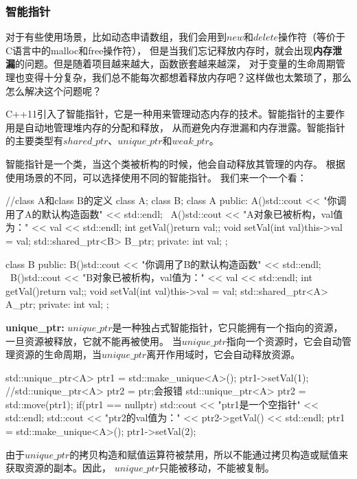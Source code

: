 \subsubsection{智能指针}
对于有些使用场景，比如动态申请数组，我们会用到$new$和$delete$操作符（等价于C语言中的malloc和free操作符），
但是当我们忘记释放内存时，就会出现\textbf{内存泄漏}的问题。但是随着项目越来越大，函数嵌套越来越深，
对于变量的生命周期管理也变得十分复杂，我们总不能每次都想着释放内存吧？这样做也太繁琐了，那么怎么解决这个问题呢？

C++11引入了智能指针，它是一种用来管理动态内存的技术。智能指针的主要作用是自动地管理堆内存的分配和释放，
从而避免内存泄漏和内存泄露。智能指针的主要类型有\textbf{$shared\_ptr$}、\textbf{$unique\_ptr$}和\textbf{$weak\_ptr$}。

智能指针是一个类，当这个类被析构的时候，他会自动释放其管理的内存。
根据使用场景的不同，可以选择使用不同的智能指针。
我们来一个一个看：

\begin{tcode}
//class A和class B的定义
class A;
class B;
class A{
public:
    A(){std::cout << "你调用了A的默认构造函数" << std::endl;}
    ~A(){std::cout << "A对象已被析构，val值为：" << val << std::endl;}
    int getVal(){return val;};
    void setVal(int val){this->val = val;}
    std::shared_ptr<B> B_ptr;
private:
    int val;
};

class B{
public:
    B(){std::cout << "你调用了B的默认构造函数" << std::endl;}
    ~B(){std::cout << "B对象已被析构，val值为：" << val << std::endl;}
    int getVal(){return val;};
    void setVal(int val){this->val = val;}
    std::shared_ptr<A> A_ptr;
private:
    int val;    
};
\end{tcode}

\textbf{unique\_ptr:} 
$unique\_ptr$是一种独占式智能指针，它只能拥有一个指向的资源，一旦资源被释放，它就不能再被使用。
当$unique\_ptr$指向一个资源时，它会自动管理资源的生命周期，当$unique\_ptr$离开作用域时，它会自动释放资源。

\begin{tcode}
{
    std::unique_ptr<A> ptr1 = std::make_unique<A>();
    ptr1->setVal(1);
    //std::unique_ptr<A> ptr2 = ptr;会报错
    std::unique_ptr<A> ptr2 = std::move(ptr1);
    if(ptr1 == nullptr){
        std::cout << "ptr1是一个空指针" << std::endl;
    }
    std::cout << "ptr2的val值为：" << ptr2->getVal() << std::endl;
    ptr1 = std::make_unique<A>();
    ptr1->setVal(2);
}
\end{tcode}
由于$unique\_ptr$的拷贝构造和赋值运算符被禁用，所以不能通过拷贝构造或赋值来获取资源的副本。因此，
$unique\_ptr$只能被移动，不能被复制。

